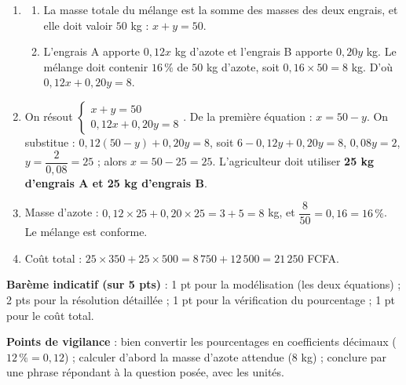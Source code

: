 \documentclass[11pt]{article}
\begin{document}
\begin{corrige}
\begin{enumerate}
\item \begin{enumerate}
\item La masse totale du mélange est la somme des masses des deux engrais, et elle doit valoir $50$ kg : $x+y=50$.
\item L'engrais A apporte $0{,}12x$ kg d'azote et l'engrais B apporte $0{,}20y$ kg. Le mélange doit contenir $16\,\%$ de $50$ kg d'azote, soit $0{,}16\times 50=8$ kg. D'où $0{,}12x+0{,}20y=8$.
\end{enumerate}
\item On résout $\begin{cases} x+y=50 \\ 0{,}12x+0{,}20y=8 \end{cases}$. De la première équation : $x=50-y$. On substitue : $0{,}12(50-y)+0{,}20y=8$, soit $6-0{,}12y+0{,}20y=8$, $0{,}08y=2$, $y=\dfrac{2}{0{,}08}=25$ ; alors $x=50-25=25$. L'agriculteur doit utiliser \textbf{25 kg d'engrais A et 25 kg d'engrais B}.
\item Masse d'azote : $0{,}12\times 25+0{,}20\times 25=3+5=8$ kg, et $\dfrac{8}{50}=0{,}16=16\,\%$. Le mélange est conforme.
\item Coût total : $25\times 350+25\times 500=8\,750+12\,500=21\,250$ FCFA.
\end{enumerate}
\textbf{Barème indicatif (sur 5 pts)} : 1 pt pour la modélisation (les deux équations) ; 2 pts pour la résolution détaillée ; 1 pt pour la vérification du pourcentage ; 1 pt pour le coût total.\par
\textbf{Points de vigilance} : bien convertir les pourcentages en coefficients décimaux ($12\,\%=0{,}12$) ; calculer d'abord la masse d'azote attendue ($8$ kg) ; conclure par une phrase répondant à la question posée, avec les unités.
\end{corrige}
\end{document}
